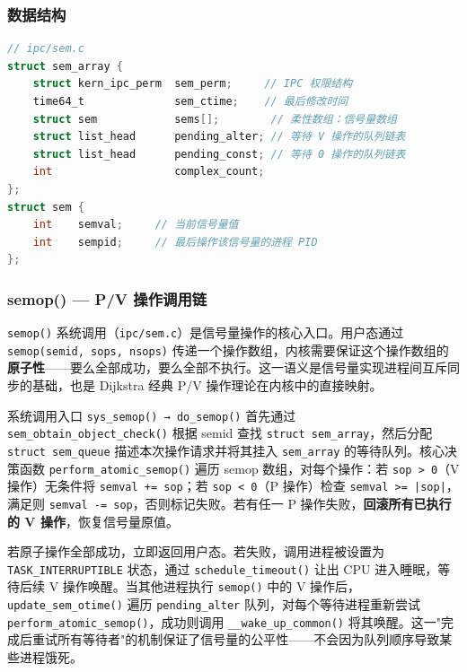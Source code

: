 \documentclass[a4paper]{article}
\begin{document}
\subsubsection{数据结构}

\begin{lstlisting}[language=C, caption={sem\_array 信号量集结构（ipc/sem.c）}, label={lst:sem_array}]
// ipc/sem.c
struct sem_array {
    struct kern_ipc_perm  sem_perm;     // IPC 权限结构
    time64_t              sem_ctime;    // 最后修改时间
    struct sem            sems[];        // 柔性数组：信号量数组
    struct list_head      pending_alter; // 等待 V 操作的队列链表
    struct list_head      pending_const; // 等待 0 操作的队列链表
    int                   complex_count;
};
struct sem {
    int    semval;     // 当前信号量值
    int    sempid;     // 最后操作该信号量的进程 PID
};
\end{lstlisting}

\subsubsection{semop() — P/V 操作调用链}

\texttt{semop()} 系统调用（\texttt{ipc/sem.c}）是信号量操作的核心入口。用户态通过 \texttt{semop(semid, sops, nsops)} 传递一个操作数组，内核需要保证这个操作数组的\textbf{原子性}——要么全部成功，要么全部不执行。这一语义是信号量实现进程间互斥同步的基础，也是 Dijkstra 经典 P/V 操作理论在内核中的直接映射。

系统调用入口 \texttt{sys\_semop() → do\_semop()} 首先通过 \texttt{sem\_obtain\_object\_check()} 根据 semid 查找 \texttt{struct sem\_array}，然后分配 \texttt{struct sem\_queue} 描述本次操作请求并将其挂入 \texttt{sem\_array} 的等待队列。核心决策函数 \texttt{perform\_atomic\_semop()} 遍历 semop 数组，对每个操作：若 \texttt{sop > 0}（V 操作）无条件将 \texttt{semval += sop}；若 \texttt{sop < 0}（P 操作）检查 \texttt{semval >= |sop|}，满足则 \texttt{semval -= sop}，否则标记失败。若有任一 P 操作失败，\textbf{回滚所有已执行的 V 操作}，恢复信号量原值。

若原子操作全部成功，立即返回用户态。若失败，调用进程被设置为 \texttt{TASK\_INTERRUPTIBLE} 状态，通过 \texttt{schedule\_timeout()} 让出 CPU 进入睡眠，等待后续 V 操作唤醒。当其他进程执行 \texttt{semop()} 中的 V 操作后，\texttt{update\_sem\_otime()} 遍历 \texttt{pending\_alter} 队列，对每个等待进程重新尝试 \texttt{perform\_atomic\_semop()}，成功则调用 \texttt{\_\_wake\_up\_common()} 将其唤醒。这一"完成后重试所有等待者"的机制保证了信号量的公平性——不会因为队列顺序导致某些进程饿死。
\end{document}
